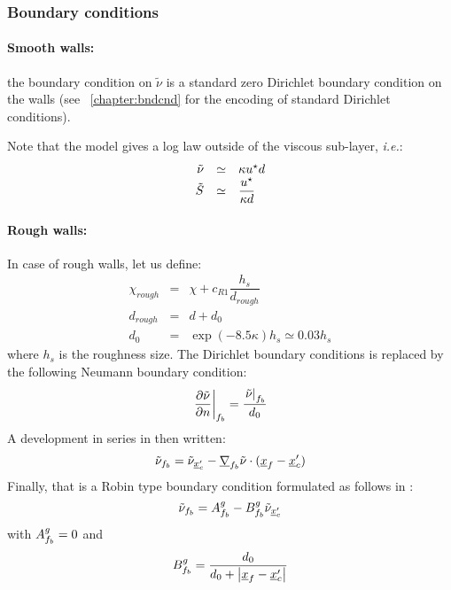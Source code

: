 \subsubsection{Boundary conditions}

\paragraph{Smooth walls:}
the boundary condition on $\tilde{\nu}$ is a standard zero Dirichlet boundary condition on the walls
(see \chaptername~\ref{chapter:bndcnd} for the encoding of standard Dirichlet conditions).

Note that the model gives a log law outside of the viscous sub-layer, \emph{i.e.}:
\begin{equation}
\begin{array}{r c l}
\tilde{\nu} & \simeq & \kappa u^\star d \\
\tilde{S} & \simeq & \dfrac{u^\star}{ \kappa d}
\end{array}
\end{equation}

\paragraph{Rough walls:}
In case of rough walls, let us define:
\begin{equation}
\begin{array}{rcl}
\chi_{rough} & = & \chi + c_{R1} \dfrac{h_s}{d_{rough}} \\
d_{rough} & = & d + d_0 \\
d_0     & = & \exp \left( -8.5 \kappa \right) h_s \simeq 0.03 h_s
\end{array}
\end{equation}
%
where $h_s$ is the roughness size. The Dirichlet boundary conditions
is replaced by the following Neumann boundary condition:
%
\begin{equation}\label{eq:eq_neumann_nu}
\left. \dfrac{\partial \tilde{ \nu}}{\partial n} \right|_{{f}_{b}} = \dfrac{\left. \tilde{ \nu}\right|_{{f}_{b}} }{ d_0}
\end{equation}
%
A development in series in then written:
\begin{equation}\label{eq:eq_neumann_nu_vf}
  \tilde{\nu}_{{f}_{b}} = \tilde{\nu}_{\underline{x}_{c}^\prime} -   \underline{\nabla}_{{f}_{b}} \tilde{ \nu} \cdot (\underline{x}_{{f}} -\underline{x}_{c}^\prime)
\end{equation}
Finally, that is a Robin type boundary condition formulated as follows in \CS:
\begin{equation}\label{eq:eq_neumann_nu_coef}
  \tilde{\nu}_{{f}_{b}} = A^g_{{f}_{b}} - B^g_{{f}_{b}} \tilde{\nu}_{\underline{x}_{c}^\prime}
\end{equation}
with $A^g_{{f}_{b}}=0$ and
%
\begin{equation}\label{eq:eq_neumann_nu_coefb}
  B^g_{{f}_{b}} = \dfrac{d_0}{d_0 + \left| \underline{x}_{{f}} - \underline{x}_{c}^\prime \right| }
\end{equation}

